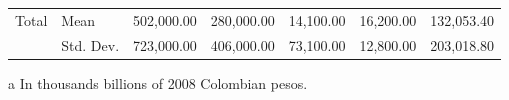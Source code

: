 \documentclass[11pt,a4paper,oneside]{article}
\begin{document}
\begin{table}[htbp]
{\begin{threeparttable}
\begin{tabular}{clrrrrr}
  \midrule
    \multicolumn{1}{l}{Total} & Mean  & 502,000.00 & 280,000.00 & 14,100.00 & 16,200.00 & 132,053.40 \\
          & Std. Dev. & 723,000.00 & 406,000.00 & 73,100.00 & 12,800.00 & 203,018.80 \\
    \bottomrule
    \end{tabular}
 \begin{tablenotes}
 \item[a]In thousands billions of 2008 Colombian pesos.
 \end{tablenotes}
 \end{threeparttable}}
\end{table}

\vspace*{\fill}

\pagebreak
\clearpage


\vspace*{\fill}
\end{document}
